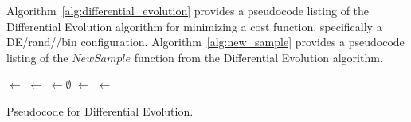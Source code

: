 Algorithm~\ref{alg:differential_evolution} provides a pseudocode listing of the Differential Evolution algorithm for minimizing a cost function, specifically a DE/\-rand//\-bin configuration. Algorithm~\ref{alg:new_sample} provides a pseudocode listing of the $NewSample$ function from the Differential Evolution algorithm.

\begin{algorithm}[ht]
	\SetLine  

	
  
	\KwIn{\PopulationSize, \NumParameters, \WeightingFactor, \CrossoverRate}		
	\KwOut{\Best}
	\Population $\leftarrow$ \InitializePopulation{\PopulationSize, \NumParameters}\;
	\EvaluateCost{\Population}\;
	\Best $\leftarrow$ \GetBestSolution{\Population}\;
	\While{$\neg$\StopCondition{}} {
		\NewPopulation $\leftarrow \emptyset$\;
		\ForEach{\Member $\in$ \Population}{
			\Sample $\leftarrow$ \NewSample{\Member, \Population, \NumParameters, \WeightingFactor, \CrossoverRate}\;
			\eIf{\Cost{\Sample} $\leq$ \Cost{\Member}}{
				\NewPopulation $\leftarrow$ \Sample\;
			}
			{
				\NewPopulation $\leftarrow$ \Member\;
			}
		}
		\Population $\leftarrow$ \NewPopulation\;
		\EvaluateCost{\Population}\;
		\Best $\leftarrow$ \GetBestSolution{\Population}\;
	}
	\Return{\Best}\;
	\caption{Pseudocode for Differential Evolution.}
	\label{alg:differential_evolution}
\end{algorithm}


